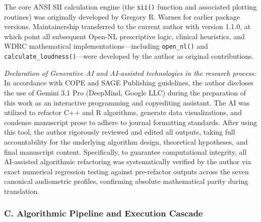 \documentclass[
  12pt,
]{article}
\begin{document}
The core ANSI SII calculation engine (the \texttt{sii()} function and
associated plotting routines) was originally developed by Gregory R.
Warnes for earlier package versions. Maintainership transferred to the
current author with version 1.1.0, at which point all subsequent Open-NL
prescriptive logic, clinical heuristics, and WDRC mathematical
implementations---including \texttt{open\_nl()} and
\texttt{calculate\_loudness()}---were developed by the author as
original contributions.

\emph{Declaration of Generative AI and AI-assisted technologies in the
research process:} In accordance with COPE and SAGE Publishing
guidelines, the author discloses the use of Gemini 3.1 Pro (DeepMind,
Google LLC) during the preparation of this work as an interactive
programming and copyediting assistant. The AI was utilized to refactor
C++ and R algorithms, generate data visualizations, and condense
manuscript prose to adhere to journal formatting standards. After using
this tool, the author rigorously reviewed and edited all outputs, taking
full accountability for the underlying algorithm design, theoretical
hypotheses, and final manuscript content. Specifically, to guarantee
computational integrity, all AI-assisted algorithmic refactoring was
systematically verified by the author via exact numerical regression
testing against pre-refactor outputs across the seven canonical
audiometric profiles, confirming absolute mathematical parity during
translation.

\subsubsection{C. Algorithmic Pipeline and Execution
Cascade}\label{c.-algorithmic-pipeline-and-execution-cascade}
\end{document}
